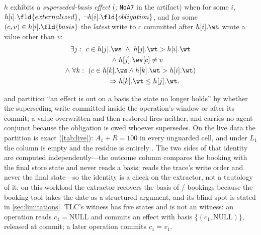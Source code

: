 \begin{definition}
\label{def:residue}
$h$ exhibits a \emph{superseded-basis effect} (\Rp{}; \texttt{NoA7} in the
artifact) when for some $i$, $h[i].\fld{externalized}$,
$\neg h[i].\fld{obligation}$, and for some $(c,v)\in h[i].\fld{basis}$ the
\emph{latest} write to $c$ committed after $h[i].\wt$ wrote a value other
than $v$:
\[
  \begin{gathered}
  \exists j:\ c\in h[j].\ws \;\wedge\; h[j].\wt > h[i].\wt\\
  \qquad\wedge\; h[j].\wv[c]\neq v\\
  \wedge\ \forall k:\ (c\in h[k].\ws \wedge h[k].\wt > h[i].\wt)\\
  \qquad\qquad\Rightarrow h[k].\wt \le h[j].\wt.
  \end{gathered}
\]
\end{definition}

 and \Rp{} partition ``an effect is out on a basis the state no longer
holds'' by whether the superseding write committed inside the operation's
window or after its commit; a value overwritten and then restored fires
neither, and \Rp{} carries no agent conjunct because the obligation is owed
whoever supersedes. On the live data the partition is exact
(\cref{tab:live}): $A_1 + R = 100$ in every unguarded cell, and under $L_1$
the  column is empty and the residue is entirely \Rp{}. The two sides of
that identity are computed independently---the outcome column compares the
booking with the final store state and never reads a basis; \Rp{} reads the
trace's write order and never the final state---so the identity is a check
on the extractor, not a tautology of it; on this workload the extractor
recovers the basis of \HypBasisRecovered/\HypBookings{} bookings because the
booking tool takes the date as a structured argument, and its blind spot is
stated in \cref{sec:limitations}. TLC's witness has five states and is not
an  witness: an operation reads $c_1=\mathrm{NULL}$ and commits an effect
with basis $\{(c_1,\mathrm{NULL})\}$, released at commit; a later operation
commits $c_1=v_1$.

